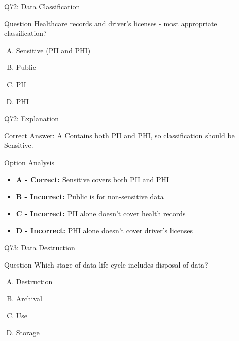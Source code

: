 \documentclass{beamer}
\begin{document}
	\begin{frame}{Q72: Data Classification}
		\begin{block}{Question}
			Healthcare records and driver's licenses - most appropriate classification?
		\end{block}
		\begin{enumerate}[(A)]
			\item Sensitive (PII and PHI)
			\item Public
			\item PII
			\item PHI
		\end{enumerate}
	\end{frame}
	
	\begin{frame}{Q72: Explanation}
		\begin{block}{Correct Answer: A}
			Contains both PII and PHI, so classification should be Sensitive.
		\end{block}
		\begin{block}{Option Analysis}
			\begin{itemize}
				\item \textbf{A - Correct:} Sensitive covers both PII and PHI
				\item \textbf{B - Incorrect:} Public is for non-sensitive data
				\item \textbf{C - Incorrect:} PII alone doesn't cover health records
				\item \textbf{D - Incorrect:} PHI alone doesn't cover driver's licenses
			\end{itemize}
		\end{block}
	\end{frame}
	
	\begin{frame}{Q73: Data Destruction}
		\begin{block}{Question}
			Which stage of data life cycle includes disposal of data?
		\end{block}
		\begin{enumerate}[(A)]
			\item Destruction
			\item Archival
			\item Use
			\item Storage
		\end{enumerate}
	\end{frame}
	
\end{document}
